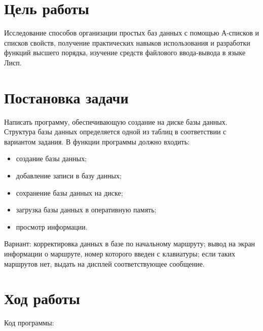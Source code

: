 \documentclass[a4paper,14pt]{extarticle}
\begin{document}


\section{Цель работы}
Исследование способов организации простых баз данных с помощью А-списков и
списков свойств, получение практических навыков использования и разработки
функций высшего порядка, изучение средств файлового ввода-вывода в языке Лисп.

\section{Постановка задачи}
Написать программу, обеспечивающую создание на диске базы данных. Структура базы
данных определяется одной из таблиц в соответствии с вариантом задания. В
функции программы должно входить:
\begin{itemize}
  \item создание базы данных;
  \item добавление записи в базу данных;
  \item сохранение базы данных на диске;
  \item загрузка базы данных в оперативную память;
  \item просмотр информации.
\end{itemize}

Вариант: корректировка данных в базе по начальному маршруту; вывод на экран информации о
маршруте, номер которого введен с клавиатуры; если таких маршрутов нет, выдать
на дисплей соответствующее сообщение.

\section{Ход работы}
Код программы:
\end{document}
